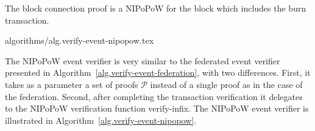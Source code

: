 The block connection proof is a NIPoPoW for the block which includes the burn transaction.

{algorithms/alg.verify-event-nipopow.tex}

The NIPoPoW event verifier is very similar to the federated event verifier presented in Algorithm~\ref{alg.verify-event-federation}, with two differences. First, it takes as a parameter a set of proofs $\mathcal{P}$ instead of a single proof as in the case of the federation. Second, after completing the transaction verification it delegates to the NIPoPoW verification function \textsf{verify-infix}. The NIPoPoW event verifier is illustrated in Algorithm~\ref{alg.verify-event-nipopow}.
